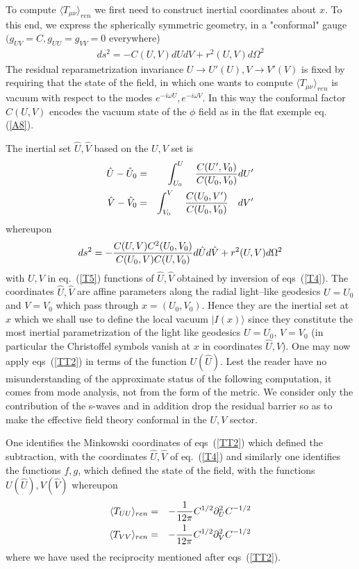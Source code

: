 \documentclass[12pt,oneside]{report}
\def\om{\omega	}
\begin{document}
To compute $ \langle  T_{\mu\nu} \rangle_{ren}$ we first need to construct
inertial coordinates about $x$. To this end, we express the spherically
symmetric geometry, in a "conformal" gauge $ ( g_{UV}=C, g_{UU} = g_{VV} = 0 $
everywhere)  \begin {eqnarray}  ds^2 = - C(U,V) dU dV + r^2(U, V) d\Omega^2
\label {Ttwo} \end {eqnarray} 
The residual reparametrization invariance $U \to
U'(U), V \to V'(V)$ is fixed by requiring that the state of the field, in which
one wants to compute  $ \langle T_{\mu\nu} \rangle_{ren}$ is vacuum with respect
to the modes $e^{-i\om U}, e^{-i\om V}$.  In this way the conformal factor
$C(U,V)$ encodes the vacuum state of the $\phi$ field as in the flat exemple eq.
(\ref{A8}).

The inertial set $\hat U, \hat V$ based on the $U,V$ set is \begin{eqnarray}
\hat U - \hat U_0 & = & \int _{U_0} ^{U} \quad {C(U ^\prime, V_0) \over C (U_0,
V_0)} dU^\prime \nonumber \\ \hat V - \hat V_0 & = & \int _{V_0} ^{V} \quad
{C(U_0, V^ \prime) \over C(U_0, V_0)} \quad dV^\prime \label {T4}  \end{eqnarray}
 whereupon \begin{eqnarray} ds^2 = - {C(U,V) C^2 ( U_0, V_0) \over C(U_0, V)
C(U, V_0)}  d \hat U d \hat V + r^2(U, V)d\Omega^2
 \label{T5} \end{eqnarray} with $  U, V$ in eq.~(\ref{T5}) functions of $\hat U, \hat
V$ obtained by inversion of eqs~(\ref{T4}).  The coordinates $\hat U, \hat V$ are
affine parameters along the radial  light--like geodesics $U=U_0$ and $V=V_0$
which pass through $x=(U_0,V_0)$. Hence they are the inertial set at $x$ which
we shall use to define the local vacuum $\vert I(x) \rangle$ since they
constitute the most inertial parametrization of the light like geodesics
$U=U_0$, $V=V_0$ (in particular the Christoffel symbols vanish at $x$ in
coordinates $\hat U, \hat V$). One may now apply eqs~(\ref{TT2}) in terms of the
function $ U(\hat U)$. Lest the reader have no misunderstanding of the approximate 
status of the following computation, it comes from mode analysis, not from the form of the metric.
 We consider
only the contribution of the s-waves and in addition drop the residual barrier so as
to make the effective field theory conformal in the $U,V$ sector.

One identifies the Minkowski coordinates
of eqs~(\ref{TT2}) which defined the subtraction,  with the coordinates $\hat U, \hat
V$ of eq.~(\ref{T4}) and similarly one identifies the functions $f,g$, which defined
the state of the field, with the functions $  U(\hat U), V( \hat V)$  whereupon 
\begin{eqnarray} \langle T_{ UU} \rangle _{ren} & = &  -{1 \over 12 \pi} C^ {1/2
}\partial_{U}^{2} C^{-1/2}  \nonumber \\ \langle T_{VV} \rangle _{ren} & = & 
-{1 \over 12 \pi} C^{ 1/2} \partial_{V} ^{2} C^{-1/2}  \label {T6} 
\end{eqnarray} where we have used the reciprocity mentioned after eqs~(\ref{TT2}).
\end{document}
